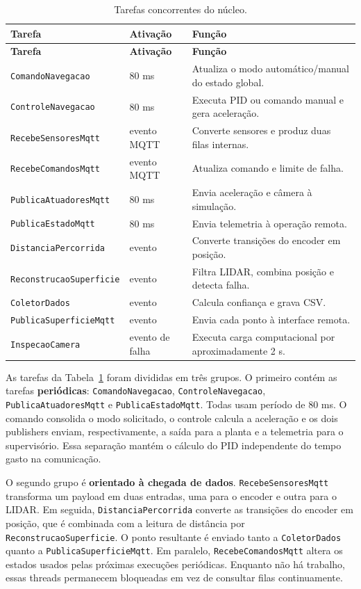 \documentclass[12pt,a4paper]{article}
\begin{document}
\begingroup
\small
\begin{longtable}{p{5.4cm}p{2.1cm}p{5.8cm}}
\caption{Tarefas concorrentes do núcleo.}
\label{tab:threads}\\
\toprule
\textbf{Tarefa} & \textbf{Ativação} & \textbf{Função} \\
\midrule
\endfirsthead
\toprule
\textbf{Tarefa} & \textbf{Ativação} & \textbf{Função} \\
\midrule
\endhead
\texttt{ComandoNavegacao} & 80 ms & Atualiza o modo automático/manual do estado global. \\
\texttt{ControleNavegacao} & 80 ms & Executa PID ou comando manual e gera aceleração. \\
\texttt{RecebeSensoresMqtt} & evento MQTT & Converte sensores e produz duas filas internas. \\
\texttt{RecebeComandosMqtt} & evento MQTT & Atualiza comando e limite de falha. \\
\texttt{PublicaAtuadoresMqtt} & 80 ms & Envia aceleração e câmera à simulação. \\
\texttt{PublicaEstadoMqtt} & 80 ms & Envia telemetria à operação remota. \\
\texttt{DistanciaPercorrida} & evento & Converte transições do encoder em posição. \\
\texttt{ReconstrucaoSuperficie} & evento & Filtra LIDAR, combina posição e detecta falha. \\
\texttt{ColetorDados} & evento & Calcula confiança e grava CSV. \\
\texttt{PublicaSuperficieMqtt} & evento & Envia cada ponto à interface remota. \\
\texttt{InspecaoCamera} & evento de falha & Executa carga computacional por aproximadamente 2 s. \\
\bottomrule
\end{longtable}
\endgroup

As tarefas da Tabela~\ref{tab:threads} foram divididas em três grupos. O primeiro contém as tarefas \textbf{periódicas}: \texttt{ComandoNavegacao}, \texttt{ControleNavegacao}, \texttt{PublicaAtuadoresMqtt} e \texttt{PublicaEstadoMqtt}. Todas usam período de 80 ms. O comando consolida o modo solicitado, o controle calcula a aceleração e os dois publishers enviam, respectivamente, a saída para a planta e a telemetria para o supervisório. Essa separação mantém o cálculo do PID independente do tempo gasto na comunicação.

O segundo grupo é \textbf{orientado à chegada de dados}. \texttt{RecebeSensoresMqtt} transforma um payload em duas entradas, uma para o encoder e outra para o LIDAR. Em seguida, \texttt{DistanciaPercorrida} converte as transições do encoder em posição, que é combinada com a leitura de distância por \texttt{ReconstrucaoSuperficie}. O ponto resultante é enviado tanto a \texttt{ColetorDados} quanto a \texttt{PublicaSuperficieMqtt}. Em paralelo, \texttt{RecebeComandosMqtt} altera os estados usados pelas próximas execuções periódicas. Enquanto não há trabalho, essas threads permanecem bloqueadas em vez de consultar filas continuamente.
\end{document}

